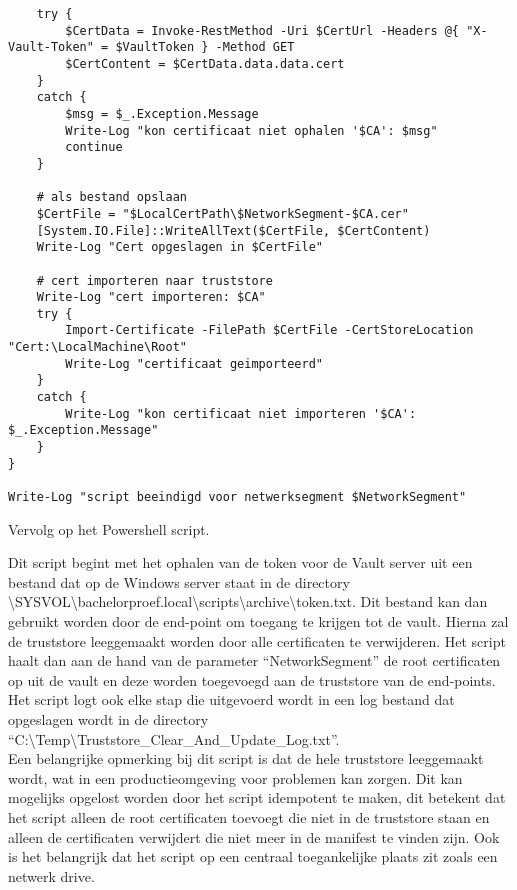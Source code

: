 \begin{listing}[H]\ContinuedFloat
\begin{verbatim}
    try {
        $CertData = Invoke-RestMethod -Uri $CertUrl -Headers @{ "X-Vault-Token" = $VaultToken } -Method GET
        $CertContent = $CertData.data.data.cert  
    }
    catch {
        $msg = $_.Exception.Message
        Write-Log "kon certificaat niet ophalen '$CA': $msg"
        continue
    }

    # als bestand opslaan
    $CertFile = "$LocalCertPath\$NetworkSegment-$CA.cer"
    [System.IO.File]::WriteAllText($CertFile, $CertContent)
    Write-Log "Cert opgeslagen in $CertFile"

    # cert importeren naar truststore
    Write-Log "cert importeren: $CA"
    try {
        Import-Certificate -FilePath $CertFile -CertStoreLocation "Cert:\LocalMachine\Root"
        Write-Log "certificaat geimporteerd"
    }
    catch {
        Write-Log "kon certificaat niet importeren '$CA': $_.Exception.Message"
    }
}

Write-Log "script beeindigd voor netwerksegment $NetworkSegment"

\end{verbatim}
\caption[]{Vervolg op het Powershell script.}
\end{listing}

Dit script begint met het ophalen van de token voor de Vault server uit een bestand dat op de Windows server staat in de directory \\
\backslash SYSVOL\textbackslash bachelorproef.local\textbackslash scripts\textbackslash archive\textbackslash token.txt.
Dit bestand kan dan gebruikt worden door de end-point om toegang te krijgen tot de vault.
Hierna zal de truststore leeggemaakt worden door alle certificaten te verwijderen. Het script haalt dan aan de hand van de parameter ``NetworkSegment'' de root certificaten op uit de vault en deze worden toegevoegd aan de truststore van de end-points.
Het script logt ook elke stap die uitgevoerd wordt in een log bestand dat opgeslagen wordt in de directory ``C:\textbackslash Temp\textbackslash Truststore\_Clear\_And\_Update\_Log.txt''. \\

Een belangrijke opmerking bij dit script is dat de hele truststore leeggemaakt wordt, wat in een productieomgeving voor problemen kan zorgen. Dit kan mogelijks opgelost worden door het script idempotent te maken, dit betekent dat het script alleen de root certificaten toevoegt die niet in de truststore staan en alleen de certificaten verwijdert die niet meer in de manifest te vinden zijn. 
Ook is het belangrijk dat het script op een centraal toegankelijke plaats zit zoals een netwerk drive. \\

